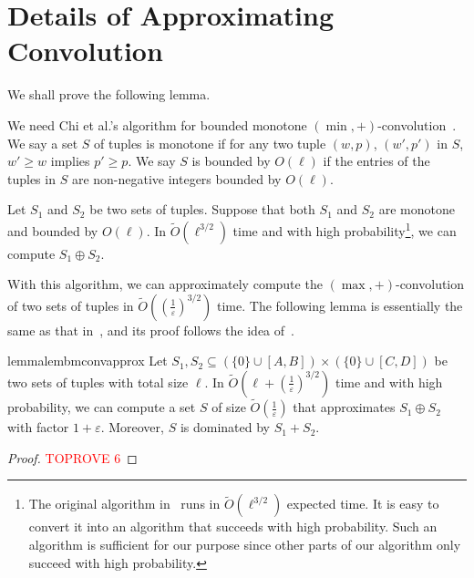 \documentclass[a4paper,UKenglish,cleveref, autoref, thm-restate, pdfa]{lipics-v2021}
\newcommand{\eps}{\varepsilon}
\renewcommand{\geq}{\geqslant}
\begin{document}


\clearpage
\appendix

\section{Details of Approximating Convolution}\label{app:conv}
We shall prove the following lemma.
\lemmerging*


We need Chi et al.'s algorithm for bounded monotone $(\min,+)$-convolution~\cite{CDXZ22}. We say a set $S$ of tuples is monotone if for any two tuple $(w, p)$, $(w', p')$ in $S$, $w' \geq w$ implies $p' \geq p$. We say $S$ is bounded by $O(\ell)$ if the entries of the tuples in $S$ are non-negative integers bounded by $O(\ell)$. 

\begin{lemma}\label{lem:bm-conv-accurate}{\normalfont \cite{CDXZ22}}
    Let $S_1$ and $S_2$ be two sets of tuples. Suppose that both $S_1$ and $S_2$ are monotone and bounded by $O(\ell)$. In $\tilde{O}(\ell^{3/2})$ time and with high probability\footnote{The original algorithm in~\cite{CDXZ22} runs in $\tilde{O}(\ell^{3/2})$ expected time. It is easy to convert it into an algorithm that succeeds with high probability. Such an algorithm is sufficient for our purpose since other parts of our algorithm only succeed with high probability.}, we can compute $S_1 \oplus S_2$.
\end{lemma}

With this algorithm, we can approximately compute the $(\max,+)$-convolution of two sets of tuples in $\tilde{O}((\frac{1}{\eps})^{3/2})$ time. The following lemma is essentially the same as that in~\cite[Lemma 28 in the full version]{BC22}, and its proof follows the idea of~\cite[Lemma 1]{Chan18}.

\begin{restatable}{lemma}{lembmconvapprox}
\label{lem:bm-conv-approx}
    Let $S_1, S_2 \subseteq (\{0\} \cup [A, B]) \times (\{0\} \cup [C, D])$ be two sets of tuples with total size $\ell$. In $\tilde{O}(\ell + (\frac{1}{\eps})^{3/2})$ time and with high probability, we can compute a set $S$ of size $\tilde{O}(\frac{1}{\eps})$ that approximates $S_1 \oplus S_2$ with factor $1 + \eps$.  Moreover, $S$ is dominated by $S_1 + S_2$.
\end{restatable}
    
\begin{proof}\textcolor{red}{TOPROVE 6}\end{proof}
\end{document}
